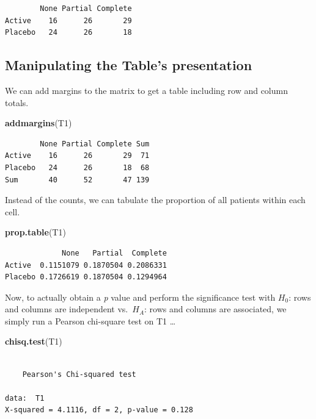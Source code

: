 \documentclass[
]{book}
\newenvironment{Shaded}{\begin{snugshade}}{\end{snugshade}}
\newcommand{\KeywordTok}[1]{\textcolor[rgb]{0.13,0.29,0.53}{\textbf{#1}}}
\newcommand{\NormalTok}[1]{#1}
\begin{document}
\begin{verbatim}
        None Partial Complete
Active    16      26       29
Placebo   24      26       18
\end{verbatim}

\hypertarget{manipulating-the-tables-presentation}{%
\subsection{Manipulating the Table's presentation}\label{manipulating-the-tables-presentation}}

We can add margins to the matrix to get a table including row and column totals.

\begin{Shaded}
\begin{Highlighting}[]
\KeywordTok{addmargins}\NormalTok{(T1)}
\end{Highlighting}
\end{Shaded}

\begin{verbatim}
        None Partial Complete Sum
Active    16      26       29  71
Placebo   24      26       18  68
Sum       40      52       47 139
\end{verbatim}

Instead of the counts, we can tabulate the proportion of all patients within each cell.

\begin{Shaded}
\begin{Highlighting}[]
\KeywordTok{prop.table}\NormalTok{(T1)}
\end{Highlighting}
\end{Shaded}

\begin{verbatim}
             None   Partial  Complete
Active  0.1151079 0.1870504 0.2086331
Placebo 0.1726619 0.1870504 0.1294964
\end{verbatim}

Now, to actually obtain a \emph{p} value and perform the significance test with \(H_0\): rows and columns are independent vs.~\(H_A\): rows and columns are associated, we simply run a Pearson chi-square test on T1 \ldots{}

\begin{Shaded}
\begin{Highlighting}[]
\KeywordTok{chisq.test}\NormalTok{(T1)}
\end{Highlighting}
\end{Shaded}

\begin{verbatim}

	Pearson's Chi-squared test

data:  T1
X-squared = 4.1116, df = 2, p-value = 0.128
\end{verbatim}
\end{document}

